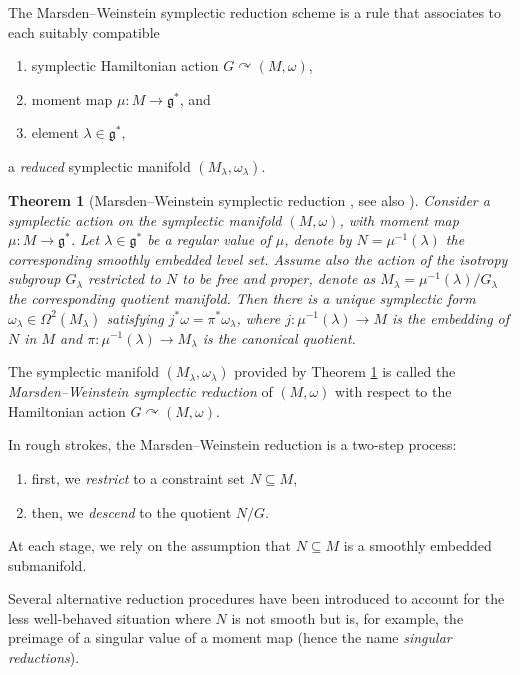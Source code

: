\documentclass[10pt,a4paper]{amsart}
\numberwithin{equation}{section}
\newtheorem{Theorem}{Theorem}[section]
\DeclareMathOperator{\action}{\curvearrowright}
\newcommand{\g}{\mathfrak{g}}
\renewcommand{\subset}{\subseteq}
\begin{document}
The Marsden--Weinstein symplectic reduction scheme is a rule that associates to each suitably compatible{\samepage
\begin{enumerate}\itemsep=0pt
	\item[(i)] symplectic Hamiltonian action $G\curvearrowright(M,\omega)$,
	\item[(ii)] moment map $\mu\colon M\to\g^*$, and
	\item[(iii)] element $\lambda\in\g^*$,
\end{enumerate}
a \emph{reduced} symplectic manifold $(M_\lambda,\omega_\lambda)$.}

\begin{Theorem}[Marsden--Weinstein symplectic reduction \cite{MarsdenWeinstein74}, see also \cite{Meyer73}]\label{thm:MW-red}
 Consider a symplectic action on the symplectic manifold $(M,\omega)$, with moment map  $\mu\colon M\to\g^\ast$.
 Let $\lambda\in\g^*$ be a regular value of $\mu$, denote by $N=\mu^{-1}(\lambda)$ the corresponding smoothly embedded level set.
 Assume also the action of the isotropy subgroup $G_\lambda$ restricted to $N$ to be free and proper, denote as $M_\lambda= \mu^{-1}(\lambda)/G_\lambda$ the corresponding quotient manifold.
 	Then there is a unique symplectic form $\omega_\lambda\in\Omega^{2}(M_\lambda)$ satisfying $j^*\omega = \pi^*\omega_\lambda$, where $j\colon \mu^{-1}(\lambda)\to M$ is the embedding of $N$ in $M$ and $\pi\colon \mu^{-1}(\lambda)\to M_\lambda$ is the canonical quotient.
\end{Theorem}

\begin{Definition}
	The symplectic manifold $(M_\lambda,\omega_\lambda)$ provided by Theorem \ref{thm:MW-red} is called the \emph{Marsden--Weinstein symplectic reduction} of $(M,\omega)$ with respect to the Hamiltonian action $G\action (M,\omega)$.
\end{Definition}

\begin{Remark}
In rough strokes, the Marsden--Weinstein reduction is a two-step process:
\begin{enumerate}\itemsep=0pt
	\item[(i)] first, we \emph{restrict} to a constraint set $N\subset M$,
	\item[(ii)] then, we \emph{descend} to the quotient $N/G$.
\end{enumerate}
At each stage, we rely on the assumption that $N\subset M$ is a smoothly embedded submanifold.

Several alternative reduction procedures have been introduced to account for the less well-behaved situation where $N$ is not smooth but is, for example, the preimage of a singular value of a moment map (hence the name \emph{singular reductions}).
\end{Remark}
\end{document}

